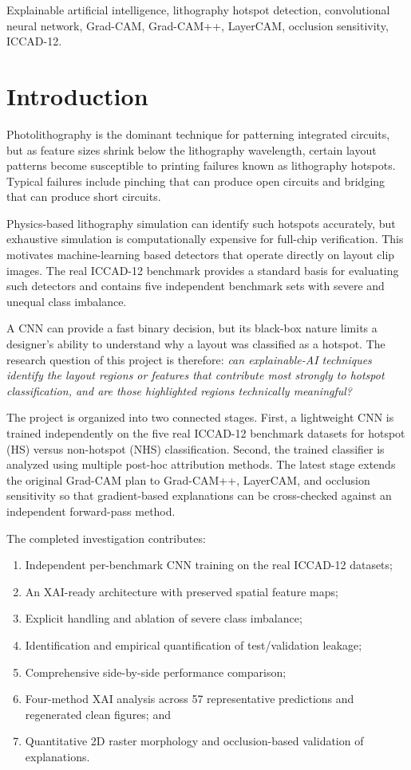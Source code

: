 \documentclass[conference]{IEEEtran}
\begin{document}
\begin{IEEEkeywords}
Explainable artificial intelligence, lithography hotspot detection, convolutional neural network, Grad-CAM, Grad-CAM++, LayerCAM, occlusion sensitivity, ICCAD-12.
\end{IEEEkeywords}

\section{Introduction}
Photolithography is the dominant technique for patterning integrated circuits, but as feature sizes shrink below the lithography wavelength, certain layout patterns become susceptible to printing failures known as lithography hotspots. Typical failures include pinching that can produce open circuits and bridging that can produce short circuits.

Physics-based lithography simulation can identify such hotspots accurately, but exhaustive simulation is computationally expensive for full-chip verification. This motivates machine-learning based detectors that operate directly on layout clip images. The real ICCAD-12 benchmark provides a standard basis for evaluating such detectors and contains five independent benchmark sets with severe and unequal class imbalance.

A CNN can provide a fast binary decision, but its black-box nature limits a designer's ability to understand why a layout was classified as a hotspot. The research question of this project is therefore: \textit{can explainable-AI techniques identify the layout regions or features that contribute most strongly to hotspot classification, and are those highlighted regions technically meaningful?}

The project is organized into two connected stages. First, a lightweight CNN is trained independently on the five real ICCAD-12 benchmark datasets for hotspot (HS) versus non-hotspot (NHS) classification. Second, the trained classifier is analyzed using multiple post-hoc attribution methods. The latest stage extends the original Grad-CAM plan to Grad-CAM++, LayerCAM, and occlusion sensitivity so that gradient-based explanations can be cross-checked against an independent forward-pass method.

The completed investigation contributes:
\begin{enumerate}
    \item Independent per-benchmark CNN training on the real ICCAD-12 datasets;
    \item An XAI-ready architecture with preserved spatial feature maps;
    \item Explicit handling and ablation of severe class imbalance;
    \item Identification and empirical quantification of test/validation leakage;
    \item Comprehensive side-by-side performance comparison;
    \item Four-method XAI analysis across 57 representative predictions and regenerated clean figures; and
    \item Quantitative 2D raster morphology and occlusion-based validation of explanations.
\end{enumerate}
\end{document}
